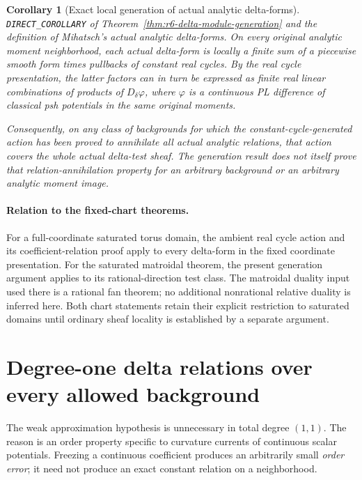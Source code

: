 \documentclass[11pt,a4paper]{article}
\numberwithin{equation}{section}
\newtheorem{corollary}[theorem]{Corollary}
\theoremstyle{definition}
\theoremstyle{remark}
\begin{document}
\begin{corollary}[Exact local generation of actual analytic delta-forms]
\label{cor:r6-analytic-delta-module-generation}
\textnormal{\texttt{DIRECT\_COROLLARY}} of
Theorem~\ref{thm:r6-delta-module-generation} and the definition of
Mihatsch's actual analytic delta-forms.
On every original analytic moment neighborhood, each actual
delta-form is locally a finite sum of a piecewise smooth form
times pullbacks of constant real cycles.  By the real cycle
presentation, the latter factors can in turn be expressed as
finite real linear combinations of products of $D_\delta\varphi$,
where $\varphi$ is a continuous PL difference of classical psh
potentials in the same original moments.

Consequently, on any class of backgrounds for which the
constant-cycle-generated action has been proved to annihilate
\emph{all actual analytic relations}, that action covers the
whole actual delta-test sheaf.  The generation result does
not itself prove that relation-annihilation property for an
arbitrary background or an arbitrary analytic moment image.
\end{corollary}

\paragraph{Relation to the fixed-chart theorems.}
For a full-coordinate saturated torus domain, the ambient
real cycle action and its coefficient-relation proof apply
to every delta-form in the fixed coordinate presentation.
For the saturated matroidal theorem, the present generation
argument applies to its rational-direction test class.
The matroidal duality input used there is a rational fan
theorem; no additional nonrational relative duality is
inferred here.  Both chart statements retain their explicit
restriction to saturated domains until ordinary sheaf
locality is established by a separate argument.



\section{Degree-one delta relations over every allowed background}
\label{sec:r6-delta-degree-one}

The weak approximation hypothesis is unnecessary in total degree
$(1,1)$.  The reason is an order property specific to curvature
currents of continuous scalar potentials.  Freezing a continuous
coefficient produces an arbitrarily small \emph{order error}; it
need not produce an exact constant relation on a neighborhood.
\end{document}
